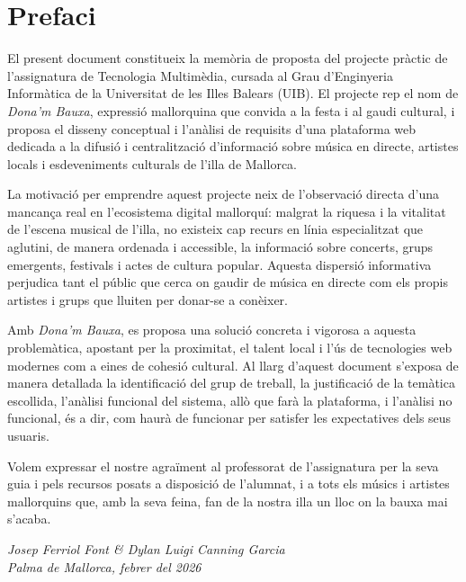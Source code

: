 \chapter*{Prefaci}

El present document constitueix la memòria de proposta del projecte pràctic de l'assignatura de Tecnologia Multimèdia, cursada al Grau d'Enginyeria Informàtica de la Universitat de les Illes Balears (UIB). El projecte rep el nom de \textit{Dona'm Bauxa}, expressió mallorquina que convida a la festa i al gaudi cultural, i proposa el disseny conceptual i l'anàlisi de requisits d'una plataforma web dedicada a la difusió i centralització d'informació sobre música en directe, artistes locals i esdeveniments culturals de l'illa de Mallorca.

La motivació per emprendre aquest projecte neix de l'observació directa d'una mancança real en l'ecosistema digital mallorquí: malgrat la riquesa i la vitalitat de l'escena musical de l'illa, no existeix cap recurs en línia especialitzat que aglutini, de manera ordenada i accessible, la informació sobre concerts, grups emergents, festivals i actes de cultura popular. Aquesta dispersió informativa perjudica tant el públic que cerca on gaudir de música en directe com els propis artistes i grups que lluiten per donar-se a conèixer.

Amb \textit{Dona'm Bauxa}, es proposa una solució concreta i vigorosa a aquesta problemàtica, apostant per la proximitat, el talent local i l'ús de tecnologies web modernes com a eines de cohesió cultural. Al llarg d'aquest document s'exposa de manera detallada la identificació del grup de treball, la justificació de la temàtica escollida, l'anàlisi funcional del sistema, allò que farà la plataforma, i l'anàlisi no funcional, és a dir, com haurà de funcionar per satisfer les expectatives dels seus usuaris.

Volem expressar el nostre agraïment al professorat de l'assignatura per la seva guia i pels recursos posats a disposició de l'alumnat, i a tots els músics i artistes mallorquins que, amb la seva feina, fan de la nostra illa un lloc on la bauxa mai s'acaba.

\begin{flushright}
{\makeatletter\itshape
    Josep Ferriol Font \& Dylan Luigi Canning Garcia \\
    Palma de Mallorca, febrer del 2026
\makeatother}
\end{flushright}
